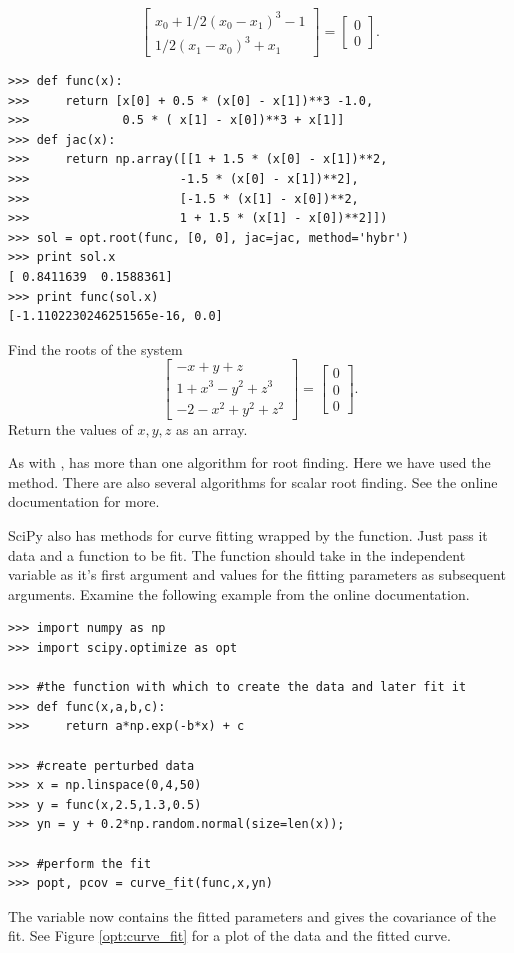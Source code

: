 \[
\begin{bmatrix}
	x_{0} + 1/2 ( x_{0} - x_{1} )^{3} - 1 \\
	1/2(x_{1}-x_{0})^{3} + x_{1}
\end{bmatrix} =
\begin{bmatrix}
	0 \\
	0
\end{bmatrix}.
\]

\begin{lstlisting}
>>> def func(x):
>>>     return [x[0] + 0.5 * (x[0] - x[1])**3 -1.0,
>>>             0.5 * ( x[1] - x[0])**3 + x[1]]
>>> def jac(x):
>>>     return np.array([[1 + 1.5 * (x[0] - x[1])**2,
>>>                     -1.5 * (x[0] - x[1])**2],
>>>                     [-1.5 * (x[1] - x[0])**2,
>>>                     1 + 1.5 * (x[1] - x[0])**2]])
>>> sol = opt.root(func, [0, 0], jac=jac, method='hybr')
>>> print sol.x
[ 0.8411639  0.1588361]
>>> print func(sol.x)
[-1.1102230246251565e-16, 0.0]
\end{lstlisting}

\begin{problem}
Find the roots of the system
\[
\begin{bmatrix}
	-x+y+z \\
	1+x^3-y^2+z^3\\
	-2-x^2+y^2+z^2
\end{bmatrix} =
\begin{bmatrix}
	0 \\
	0 \\
	0
\end{bmatrix} .
\]
Return the values of $x,y,z$ as an array.
\end{problem}



As with ,  has more than one algorithm for root finding.
Here we have used the  method. There are also several algorithms for scalar root finding. See the online documentation for more.

SciPy also has methods for curve fitting wrapped by the  function.
Just pass it data and a function to be fit. The function should take in the independent variable as it's first argument and
values for the fitting parameters as subsequent arguments.
Examine the following example from the online documentation.
\begin{lstlisting}
>>> import numpy as np
>>> import scipy.optimize as opt

>>> #the function with which to create the data and later fit it
>>> def func(x,a,b,c):
>>>     return a*np.exp(-b*x) + c

>>> #create perturbed data
>>> x = np.linspace(0,4,50)
>>> y = func(x,2.5,1.3,0.5)
>>> yn = y + 0.2*np.random.normal(size=len(x));

>>> #perform the fit
>>> popt, pcov = curve_fit(func,x,yn)
\end{lstlisting}
The variable  now contains the fitted parameters and  gives the covariance of the fit.
See Figure \ref{opt:curve_fit} for a plot of the data and the fitted curve.

